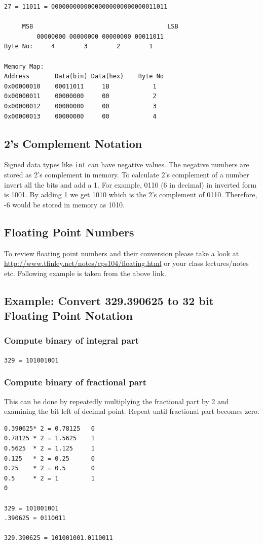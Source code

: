\documentclass[12pt,a4paper]{article}
\begin{document}
\begin{verbatim}
27 = 11011 = 00000000000000000000000000011011

     MSB                                     LSB
         00000000 00000000 00000000 00011011
Byte No:     4        3        2        1

Memory Map:
Address       Data(bin) Data(hex)    Byte No
0x00000010    00011011     1B            1
0x00000011    00000000     00            2
0x00000012    00000000     00            3
0x00000013    00000000     00            4
\end{verbatim}


\subsection{2's Complement Notation}
Signed data types like \verb|int| can have negative values. The negative numbers are stored as 2's complement in memory. To calculate 2's complement of a number invert all the bits and add a 1. For example, 0110 (6 in decimal) in inverted form is 1001. By adding 1 we get 1010 which is the 2's complement of 0110. Therefore, -6 would be stored in memory as 1010.

\subsection{Floating Point Numbers}
To review floating point numbers and their conversion please take a look at \url{http://www.tfinley.net/notes/cps104/floating.html} or your class lectures/notes etc. Following example is taken from the above link.
\subsection{Example: Convert 329.390625 to 32 bit Floating Point Notation}
\subsubsection{Compute binary of integral part}
\verb|329 = 101001001|
\subsubsection{Compute binary of fractional part}
This can be done by repeatedly multiplying the fractional part by 2 and examining the bit left of decimal point. Repeat until fractional part becomes zero.
\begin{verbatim}
0.390625* 2 = 0.78125   0
0.78125 * 2 = 1.5625    1
0.5625  * 2 = 1.125     1
0.125   * 2 = 0.25      0
0.25    * 2 = 0.5       0
0.5     * 2 = 1         1
0

329 = 101001001
.390625 = 0110011

329.390625 = 101001001.0110011
\end{verbatim}
\end{document}
